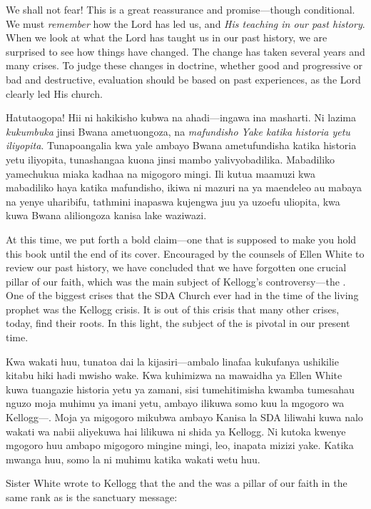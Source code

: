 We shall not fear! This is a great reassurance and promise—though conditional. We must \textit{remember} how the Lord has led us, and \textit{His teaching in our past history}. When we look at what the Lord has taught us in our past history, we are surprised to see how things have changed. The change has taken several years and many crises. To judge these changes in doctrine, whether good and progressive or bad and destructive, evaluation should be based on past experiences, as the Lord clearly led His church.


Hatutaogopa! Hii ni hakikisho kubwa na ahadi—ingawa ina masharti. Ni lazima \textit{kukumbuka} jinsi Bwana ametuongoza, na \textit{mafundisho Yake katika historia yetu iliyopita}. Tunapoangalia kwa yale ambayo Bwana ametufundisha katika historia yetu iliyopita, tunashangaa kuona jinsi mambo yalivyobadilika. Mabadiliko yamechukua miaka kadhaa na migogoro mingi. Ili kutua maamuzi kwa mabadiliko haya katika mafundisho, ikiwa ni mazuri na ya maendeleo au mabaya na yenye uharibifu, tathmini inapaswa kujengwa juu ya uzoefu uliopita, kwa kuwa Bwana aliliongoza kanisa lake waziwazi.


At this time, we put forth a bold claim—one that is supposed to make you hold this book until the end of its cover. Encouraged by the counsels of Ellen White to review our past history, we have concluded that we have forgotten one crucial pillar of our faith, which was the main subject of Kellogg’s controversy—the . One of the biggest crises that the SDA Church ever had in the time of the living prophet was the Kellogg crisis. It is out of this crisis that many other crises, today, find their roots. In this light, the subject of the  is pivotal in our present time.


Kwa wakati huu, tunatoa dai la kijasiri—ambalo linafaa kukufanya ushikilie kitabu hiki hadi mwisho wake. Kwa kuhimizwa na mawaidha ya Ellen White kuwa tuangazie historia yetu ya zamani, sisi tumehitimisha kwamba tumesahau nguzo moja muhimu ya imani yetu, ambayo ilikuwa somo kuu la mgogoro wa Kellogg—. Moja ya migogoro mikubwa ambayo Kanisa la SDA liliwahi kuwa nalo wakati wa nabii aliyekuwa hai lilikuwa ni shida ya Kellogg. Ni kutoka kwenye mgogoro huu ambapo migogoro mingine mingi, leo, inapata mizizi yake. Katika mwanga huu, somo la  ni muhimu katika wakati wetu huu.


Sister White wrote to Kellogg that the  and the  was a pillar of our faith in the same rank as is the sanctuary message:


